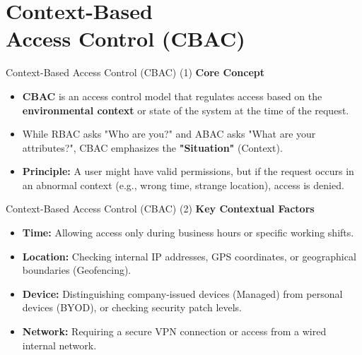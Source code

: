 \section[Context-Based Access Control]{Context-Based \\ Access Control (CBAC)}


\begin{frame}{Context-Based Access Control (CBAC) (1)}
    \Large
    \textbf{Core Concept}
    \vspace{0.3cm}
    \begin{itemize}
        \item \textbf{CBAC} is an access control model that regulates access based on the \textbf{environmental context} or state of the system at the time of the request.
        \item While RBAC asks "Who are you?" and ABAC asks "What are your attributes?", CBAC emphasizes the \textbf{"Situation"} (Context).
        \item \textbf{Principle:} A user might have valid permissions, but if the request occurs in an abnormal context (e.g., wrong time, strange location), access is denied.
    \end{itemize}
\end{frame}

\begin{frame}{Context-Based Access Control (CBAC) (2)}
    \Large
    \textbf{Key Contextual Factors}
    \vspace{0.3cm}
    \begin{itemize}
        \item \textbf{Time:} Allowing access only during business hours or specific working shifts.
        \item \textbf{Location:} Checking internal IP addresses, GPS coordinates, or geographical boundaries (Geofencing).
        \item \textbf{Device:} Distinguishing company-issued devices (Managed) from personal devices (BYOD), or checking security patch levels.
        \item \textbf{Network:} Requiring a secure VPN connection or access from a wired internal network.
    \end{itemize}
\end{frame}

